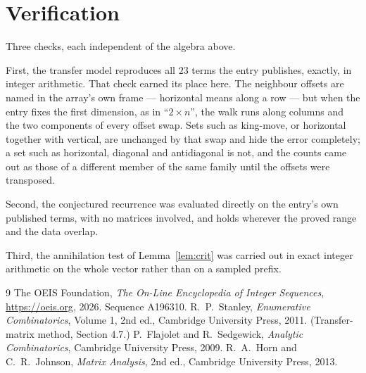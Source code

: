 \documentclass[11pt,a4paper]{article}
\theoremstyle{plain}
\theoremstyle{definition}
\begin{document}
\section{Verification}

Three checks, each independent of the algebra above.

First, the transfer model reproduces all $23$ terms the entry publishes, exactly, in
integer arithmetic. That check earned its place here. The neighbour offsets are named in the
array's own frame --- horizontal means along a row --- but when the entry fixes the first
dimension, as in ``$2\times n$'', the walk runs along columns and the two components of every
offset swap. Sets such as king-move, or horizontal together with vertical, are unchanged by
that swap and hide the error completely; a set such as horizontal, diagonal and antidiagonal
is not, and the counts came out as those of a different member of the same family until the
offsets were transposed.

Second, the conjectured recurrence was evaluated directly on the entry's own published terms,
with no matrices involved, and holds wherever the proved range and the data overlap.

Third, the annihilation test of Lemma~\ref{lem:crit} was carried out in exact integer
arithmetic on the whole vector rather than on a sampled prefix.

\begin{thebibliography}{9}
 The OEIS Foundation, \emph{The On-Line Encyclopedia of Integer
Sequences}, \url{https://oeis.org}, 2026. Sequence A196310.
 R.~P.~Stanley, \emph{Enumerative Combinatorics}, Volume 1, 2nd ed.,
Cambridge University Press, 2011. (Transfer-matrix method, Section 4.7.)
 P.~Flajolet and R.~Sedgewick, \emph{Analytic Combinatorics}, Cambridge
University Press, 2009.
 R.~A.~Horn and C.~R.~Johnson, \emph{Matrix Analysis}, 2nd ed., Cambridge
University Press, 2013.
\end{thebibliography}
\end{document}
